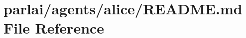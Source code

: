 \hypertarget{parlai_2agents_2alice_2README_8md}{}\section{parlai/agents/alice/\+R\+E\+A\+D\+ME.md File Reference}
\label{parlai_2agents_2alice_2README_8md}
